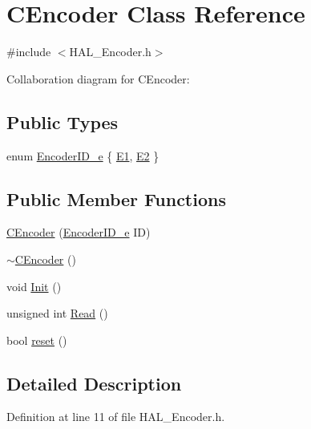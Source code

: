 \hypertarget{class_c_encoder}{}\section{C\+Encoder Class Reference}
\label{class_c_encoder}


{\ttfamily \#include $<$H\+A\+L\+\_\+\+Encoder.\+h$>$}



Collaboration diagram for C\+Encoder\+:
\subsection*{Public Types}
\begin{DoxyCompactItemize}
\item 
enum \mbox{\hyperlink{class_c_encoder_a49810cc352199fb02a60e2ef8ac6cbc3}{Encoder\+I\+D\+\_\+e}} \{ \mbox{\hyperlink{class_c_encoder_a49810cc352199fb02a60e2ef8ac6cbc3a8f0ceb6874e0c79b53bf26fa42a1b652}{E1}}, 
\mbox{\hyperlink{class_c_encoder_a49810cc352199fb02a60e2ef8ac6cbc3aaa314a69656e242defabd33eb8e90284}{E2}}
 \}
\end{DoxyCompactItemize}
\subsection*{Public Member Functions}
\begin{DoxyCompactItemize}
\item 
\mbox{\hyperlink{class_c_encoder_ab63d860ef36a6b121ab3007f70743de7}{C\+Encoder}} (\mbox{\hyperlink{class_c_encoder_a49810cc352199fb02a60e2ef8ac6cbc3}{Encoder\+I\+D\+\_\+e}} ID)
\item 
\mbox{\hyperlink{class_c_encoder_aa6b7126b6e24bd115348fa6243756f47}{$\sim$\+C\+Encoder}} ()
\item 
void \mbox{\hyperlink{class_c_encoder_a99a1c676b3fd3e6f253b273b2d740aab}{Init}} ()
\item 
unsigned int \mbox{\hyperlink{class_c_encoder_aba0cf6ffa20d8c3c4028c2e380ff73b3}{Read}} ()
\item 
bool \mbox{\hyperlink{class_c_encoder_a75c1bf0e999ea2c93937e487ab89f4a8}{reset}} ()
\end{DoxyCompactItemize}


\subsection{Detailed Description}


Definition at line 11 of file H\+A\+L\+\_\+\+Encoder.\+h.




